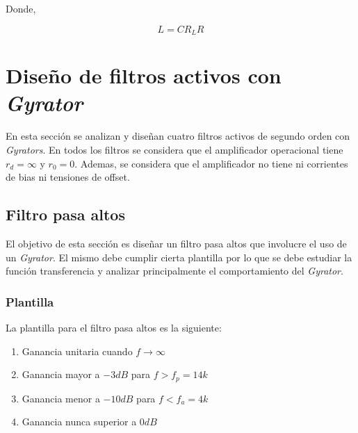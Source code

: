 \documentclass[12pt,a4paper]{article}
\begin{document}
Donde, 

\begin{equation} L = C R_L R \label{ej2_ecua_gyrator_3}\end{equation}




\section {Diseño de filtros activos con \textit{Gyrator}}
En esta sección se analizan y diseñan cuatro filtros activos de segundo orden con \textit{Gyrators}. En todos los filtros se considera que el amplificador operacional tiene $r_d = \infty$ y $r_0 = 0$. Ademas, se considera que el amplificador no tiene
ni corrientes de bias ni tensiones de offset.  


\subsection{Filtro pasa altos}
El objetivo de esta sección es diseñar un filtro pasa altos que involucre el uso de un \textit{Gyrator}. El mismo debe cumplir cierta plantilla por lo que se debe estudiar la función transferencia y analizar principalmente el comportamiento del \textit{Gyrator}. 


\subsubsection{Plantilla}
La plantilla para el filtro pasa altos es la siguiente:

\begin{enumerate}
	\item Ganancia unitaria cuando $f \rightarrow \infty$
	\item Ganancia mayor a $-3dB$ para $f>f_p = 14k$
	\item Ganancia menor a $-10dB$ para $f<f_a = 4k$
	\item Ganancia nunca superior a $0dB$  
\end{enumerate}
\end{document}
